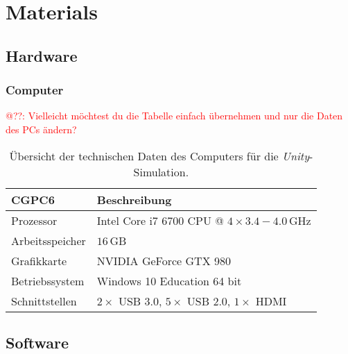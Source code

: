 \section{Materials}\label{sec:Materials}

\subsection{Hardware}\label{sec:Hardware}


\subsubsection{Computer}\label{sec:Computer}
\textcolor{red}{@??: Vielleicht möchtest du die Tabelle einfach übernehmen und nur die Daten des PCs ändern?}\\

\begin{table}
	\centering
	\begin{tabular}{|l|l|}
		\hline
		\Absatzbox{}
		\textbf{CGPC6}& \textbf{Beschreibung} \\
		\hline
		Prozessor & Intel Core i7 6700 CPU @ $4\times3.4-4.0\,$GHz \\
		\hline
		Arbeitsspeicher & $16\,$GB \\
 		\hline 
		Grafikkarte & NVIDIA GeForce GTX 980\\
		\hline
		Betriebssystem & Windows 10 Education 64 bit \\
		\hline
		Schnittstellen & $2\times$ USB 3.0, $5\times$ USB 2.0, $1\times $ HDMI\\
		\hline
	\end{tabular}
	\caption[Übersicht technische Daten des Computers für \emph{Unity}-Simulation]{Übersicht der technischen Daten des Computers für die \emph{Unity}-Simulation.}
	\label{tab:Computer}
\end{table}




\subsection{Software}



\newpage
